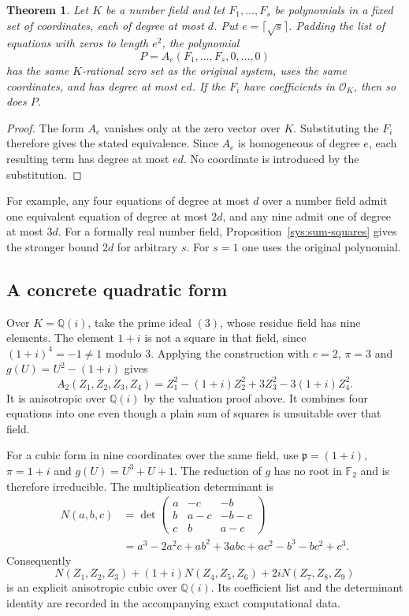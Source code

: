 \documentclass[11pt,a4paper]{article}
\newtheorem{theorem}{Theorem}[section]
\theoremstyle{definition}
\begin{document}
\begin{theorem}\label{sys:combine-field}
Let $K$ be a number field and let $F_1,\ldots,F_s$ be polynomials
in a fixed set of coordinates, each of degree at most $d$.
Put $e=\lceil\sqrt{s}\rceil$. Padding the list of equations with
zeros to length $e^2$, the polynomial
\[
                     P=A_e(F_1,\ldots,F_s,0,\ldots,0)
\]
has the same $K$-rational zero set as the original system, uses
the same coordinates, and has degree at most $ed$.
If the $F_i$ have coefficients in
$\mathcal O_K$, then so does $P$.
\end{theorem}
\begin{proof}
The form $A_e$ vanishes only at the zero vector over $K$.
Substituting the $F_i$ therefore gives the stated equivalence.
Since $A_e$ is homogeneous of degree $e$, each resulting term
has degree at most $ed$. No coordinate is introduced by the
substitution.
\end{proof}

For example, any four equations of degree at most $d$ over a
number field admit one equivalent equation of degree at most $2d$, and
any nine admit one of degree at most $3d$. For a formally real
number field, Proposition~\ref{sys:sum-squares} gives the
stronger bound $2d$ for arbitrary $s$. For $s=1$ one uses the
original polynomial.

\subsection*{A concrete quadratic form}

Over $K=\mathbb Q(i)$, take the prime ideal $(3)$, whose residue
field has nine elements. The element $1+i$ is not a square in
that field, since $(1+i)^4=-1\ne1$ modulo $3$. Applying the
construction with $e=2$, $\pi=3$ and $g(U)=U^2-(1+i)$ gives
\[
 A_2(Z_1,Z_2,Z_3,Z_4)
     =Z_1^2-(1+i)Z_2^2+3Z_3^2-3(1+i)Z_4^2.
\]
It is anisotropic over $\mathbb Q(i)$ by the valuation proof
above. It combines four equations into one even though
a plain sum of squares is unsuitable over that field.

For a cubic form in nine coordinates over the same field, use
$\mathfrak p=(1+i)$, $\pi=1+i$ and $g(U)=U^3+U+1$.
The reduction of $g$ has no root in $\mathbb F_2$ and is
therefore irreducible. The multiplication determinant is
\begin{align*}
 N(a,b,c)
  &=\det\begin{pmatrix}
       a&-c&-b\\ b&a-c&-b-c\\ c&b&a-c
       \end{pmatrix}\\
  &=a^3-2a^2c+ab^2+3abc+ac^2-b^3-bc^2+c^3.
\end{align*}
Consequently
\[
 N(Z_1,Z_2,Z_3)+(1+i)N(Z_4,Z_5,Z_6)
                      +2iN(Z_7,Z_8,Z_9)
\]
is an explicit anisotropic cubic over $\mathbb Q(i)$. Its
coefficient list and the determinant identity are recorded in
the accompanying exact computational data.
\end{document}
